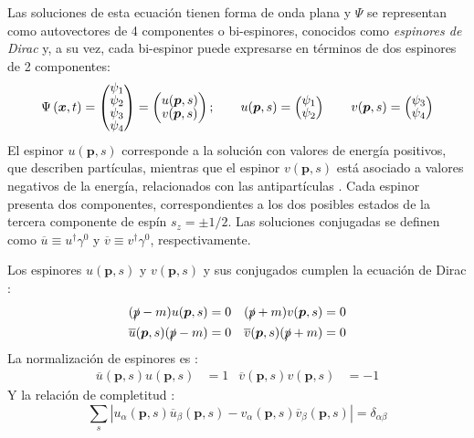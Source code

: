 Las soluciones de esta ecuación tienen forma de onda plana y $\Psi$ se representan como autovectores de 4 componentes o bi-espinores, conocidos como \textit{espinores de Dirac} \cite{MCR} y, a su vez, cada bi-espinor puede expresarse en términos de dos espinores de 2 componentes:
\begin{align}
\begingroup 
\renewcommand*{\arraystretch}{0.8}
\setlength\arraycolsep{10pt}
\Psi \left( \boldsymbol{x}, t\right) =\begin{pmatrix} \psi_{1} \\ \psi_{2} \\ \psi_{3} \\ \psi_{4} \end{pmatrix}=\begin{pmatrix} u(\boldsymbol{p},s) \\ v(\boldsymbol{p},s) \end{pmatrix}; \qquad u(\boldsymbol{p},s)=\begin{pmatrix} \psi_{1} \\ \psi_{2} \end{pmatrix} \qquad
v(\boldsymbol{p},s)=\begin{pmatrix} \psi_{3} \\ \psi_{4}\label{eq:espinores} \end{pmatrix}
\endgroup
\end{align}
El espinor $u(\boldsymbol{p},s)$ corresponde a la solución con valores de energía positivos, que describen partículas, mientras que el espinor $v(\boldsymbol{p},s)$ está asociado a valores negativos de la energía, relacionados con las antipartículas \cite{Donelly}. Cada espinor presenta dos componentes, correspondientes a los dos posibles estados de la tercera componente de espín $s_z=\pm 1/2$. \cite{Bettini} Las soluciones conjugadas se definen como $\overline{u} \equiv u^{\dagger} \gamma^{0}$ y $\overline{v} \equiv v^{\dagger} \gamma^{0}$, respectivamente.

Los espinores $u(\boldsymbol{p},s)$ y $v(\boldsymbol{p},s)$ y sus conjugados cumplen la ecuación de Dirac \cite{Donelly}:
\begin{equation}
\begin{aligned}
(\slashed{p}-m)u(\boldsymbol{p},s) &=0 & (\slashed{p}+m)v(\boldsymbol{p},s) &=0 \\
\overline{u}(\boldsymbol{p},s)(\slashed{p}-m) &=0 & \overline{v}(\boldsymbol{p},s )(\slashed{p}+m)&=0
\end{aligned}
\end{equation}
La normalización de espinores es \cite{MCR}:
\begin{align}
\overline{u}(\boldsymbol{p},s)u(\boldsymbol{p},s) &= 1 & \overline{v}(\boldsymbol{p},s)v(\boldsymbol{p},s) &= -1
\end{align}
Y la relación de completitud \cite{MCR}:  %
\begin{equation}
\sum _{s}\left| u_{\alpha }\left(\boldsymbol{p},s\right) \overline{u}_{\beta }\left(\boldsymbol{p},s\right) -v_{\alpha }\left(\boldsymbol{p},s\right) \overline{v}_{\beta }\left(\boldsymbol{p},s\right) \right| =\delta _{\alpha \beta }
\end{equation}

